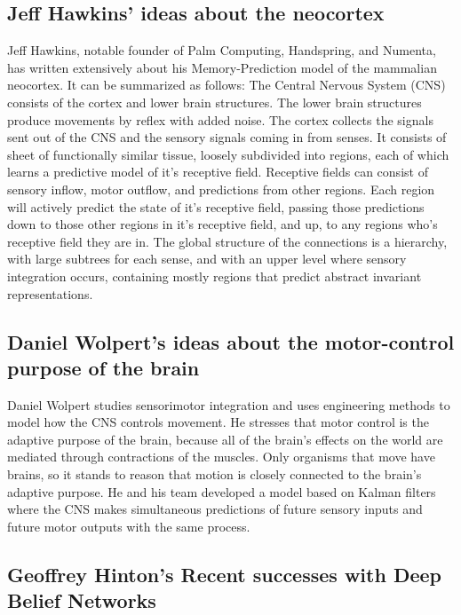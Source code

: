 \documentclass[12pt]{article}
\begin{document}
	\subsection{Jeff Hawkins' ideas about the neocortex}
	
Jeff Hawkins, notable founder of Palm Computing, Handspring, and Numenta, has written extensively about his Memory-Prediction model of the mammalian neocortex. It can be summarized as follows: The Central Nervous System (CNS) consists of the cortex and lower brain structures. The lower brain structures produce movements by reflex with added noise. The cortex collects the signals sent out of the CNS and the sensory signals coming in from senses. It consists of sheet of functionally similar tissue, loosely subdivided into regions, each of which learns a predictive model of it's receptive field. Receptive fields can consist of sensory inflow, motor outflow, and predictions from other regions. Each region will actively predict the state of it's receptive field, passing those predictions down to those other regions in it's receptive field, and up, to any regions who's receptive field they are in. The global structure of the connections is a hierarchy, with large subtrees for each sense, and with an upper level where sensory integration occurs, containing mostly regions that predict abstract invariant representations.

	\subsection{Daniel Wolpert's ideas about the motor-control purpose of the brain}
	
Daniel Wolpert studies sensorimotor integration and uses engineering methods to model how the CNS controls movement. He stresses that motor control is the adaptive purpose of the brain, because all of the brain's effects on the world are mediated through contractions of the muscles. Only organisms that move have brains, so it stands to reason that motion is closely connected to the brain's adaptive purpose. He and his team developed a model based on Kalman filters where the CNS makes simultaneous predictions of future sensory inputs and future motor outputs with the same process.
	
	\subsection{Geoffrey Hinton's Recent successes with Deep Belief Networks}
	
\end{document}
